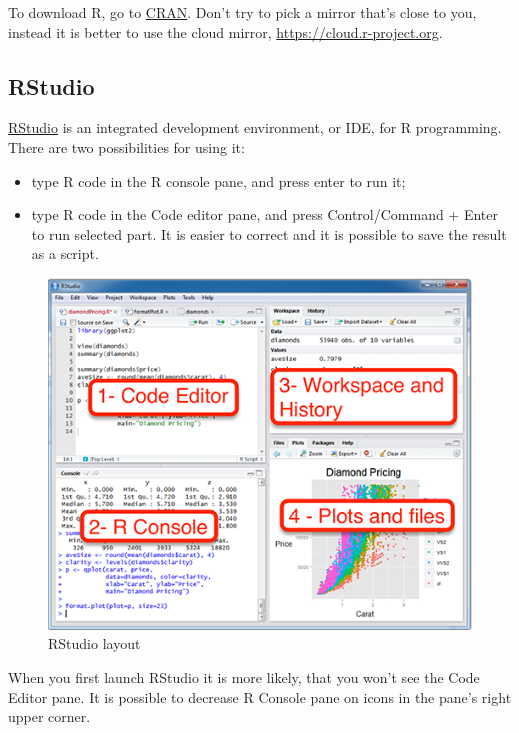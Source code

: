 \documentclass[]{book}
\providecommand{\tightlist}{%
  \setlength{\itemsep}{0pt}\setlength{\parskip}{0pt}}
\theoremstyle{definition}
\theoremstyle{definition}
\theoremstyle{definition}
\theoremstyle{remark}
\begin{document}
To download R, go to \href{https://cran.r-project.org/}{CRAN}. Don't try
to pick a mirror that's close to you, instead it is better to use the
cloud mirror, \url{https://cloud.r-project.org}.

\subsection{RStudio}\label{rstudio}

\href{https://www.rstudio.com/products/rstudio/download/}{RStudio} is an
integrated development environment, or IDE, for R programming. There are
two possibilities for using it:

\begin{itemize}
\tightlist
\item
  type R code in the R console pane, and press enter to run it;
\item
  type R code in the Code editor pane, and press Control/Command + Enter
  to run selected part. It is easier to correct and it is possible to
  save the result as a script.
\end{itemize}

\begin{figure}

{\centering \includegraphics[width=5in]{images/02-rstudio} 

}

\caption{RStudio layout}\label{fig:rstudio}
\end{figure}

When you first launch RStudio it is more likely, that you won't see the
Code Editor pane. It is possible to decrease R Console pane on icons in
the pane's right upper corner.
\end{document}
